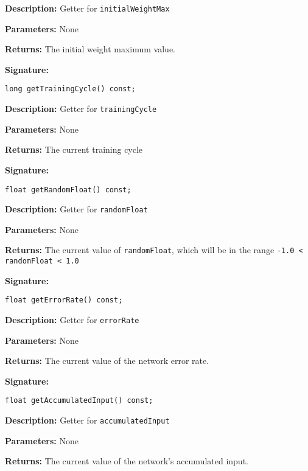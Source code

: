 \documentclass[a4paper]{article}
\begin{document}
\textbf{Description: }
Getter for \lstinline{initialWeightMax}

\textbf{Parameters: } None

\textbf{Returns: }
The initial weight maximum value.

\hrulefill %

\textbf{Signature:} \begin{lstlisting}
long getTrainingCycle() const;
\end{lstlisting}

\textbf{Description: }
Getter for \lstinline{trainingCycle}

\textbf{Parameters: } None

\textbf{Returns: }
The current training cycle

\hrulefill %

\textbf{Signature:} \begin{lstlisting}
float getRandomFloat() const;
\end{lstlisting}

\textbf{Description: }
Getter for \lstinline{randomFloat}

\textbf{Parameters: } None

\textbf{Returns: }
The current value of \lstinline{randomFloat}, which will be in the range \lstinline{-1.0 < randomFloat < 1.0}

\hrulefill %

\textbf{Signature:} \begin{lstlisting}
float getErrorRate() const;
\end{lstlisting}

\textbf{Description: }
Getter for \lstinline{errorRate}

\textbf{Parameters: } None

\textbf{Returns: }
The current value of the network error rate.

\hrulefill %

\textbf{Signature:} \begin{lstlisting}
float getAccumulatedInput() const;
\end{lstlisting}

\textbf{Description: }
Getter for \lstinline{accumulatedInput}

\textbf{Parameters: } None

\textbf{Returns: }
The current value of the network's accumulated input.
\end{document}
